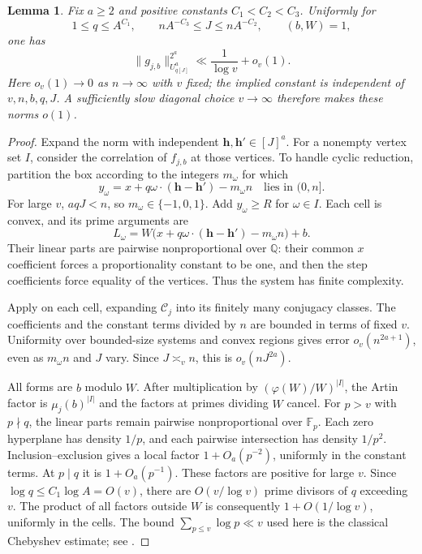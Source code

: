 \documentclass[11pt,reqno]{amsart}
\newtheorem{lemma}[theorem]{Lemma}
\theoremstyle{definition}
\numberwithin{equation}{section}
\newcommand{\Q}{\mathbb Q}
\newcommand{\F}{\mathbb F}
\begin{document}
\begin{lemma}\label{an:lem:Artinuniform}
Fix $a\ge2$ and positive constants $C_1<C_2<C_3$. Uniformly for
\[
 1\le q\le A^{C_1},\qquad
 nA^{-C_3}\le J\le nA^{-C_2},\qquad (b,W)=1,
\]
one has
\begin{equation}\label{an:eq:globaluniform}
 \|g_{j,b}\|_{U^a_{q[J]}}^{2^a}
 \ll \frac1{\log v}+o_v(1).
\end{equation}
Here $o_v(1)\to0$ as $n\to\infty$ with $v$ fixed; the implied constant is independent of $v,n,b,q,J$. A sufficiently slow diagonal choice $v\to\infty$ therefore makes these norms $o(1)$.
\end{lemma}
\begin{proof}
Expand the norm with independent $\boldsymbol h,\boldsymbol h'\in[J]^a$. For a nonempty vertex set $I$, consider the correlation of $f_{j,b}$ at those vertices. To handle cyclic reduction, partition the box according to the integers $m_\omega$ for which
\[
 y_\omega=x+q\omega\cdot(\boldsymbol h-\boldsymbol h')-m_\omega n
 \quad\text{lies in }(0,n].
\]
For large $v$, $aqJ<n$, so $m_\omega\in\{-1,0,1\}$. Add $y_\omega\ge R$ for $\omega\in I$. Each cell is convex, and its prime arguments are
\begin{equation}\label{an:eq:wrappedforms}
 L_\omega=W\bigl(x+q\omega\cdot(\boldsymbol h-\boldsymbol h')-m_\omega n\bigr)+b.
\end{equation}
Their linear parts are pairwise nonproportional over $\Q$: their common $x$ coefficient forces a proportionality constant to be one, and then the step coefficients force equality of the vertices. Thus the system has finite complexity.

Apply \cite[Theorem 1.4 and (1.15)]{FT} on each cell, expanding $\mathcal C_j$ into its finitely many conjugacy classes. The coefficients and the constant terms divided by $n$ are bounded in terms of fixed $v$. Uniformity over bounded-size systems and convex regions gives error $o_v(n^{2a+1})$, even as $m_\omega n$ and $J$ vary. Since $J\asymp_v n$, this is $o_v(nJ^{2a})$.

All forms are $b$ modulo $W$. After multiplication by $(\varphi(W)/W)^{|I|}$, the Artin factor is $\mu_j(b)^{|I|}$ and the factors at primes dividing $W$ cancel. For $p>v$ with $p\nmid q$, the linear parts remain pairwise nonproportional over $\F_p$. Each zero hyperplane has density $1/p$, and each pairwise intersection has density $1/p^2$. Inclusion--exclusion gives a local factor $1+O_a(p^{-2})$, uniformly in the constant terms. At $p\mid q$ it is $1+O_a(p^{-1})$. These factors are positive for large $v$. Since $\log q\le C_1\log A=O(v)$, there are $O(v/\log v)$ prime divisors of $q$ exceeding $v$. The product of all factors outside $W$ is consequently $1+O(1/\log v)$, uniformly in the cells. The bound $\sum_{p\le v}\log p\ll v$ used here is the classical Chebyshev estimate; see \cite{Dav}.


\end{proof}
\end{document}
